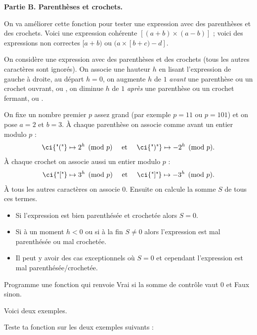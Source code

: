 \documentclass[10pt,class=report,crop=false]{standalone}
\begin{document}
\begin{activite}
\textbf{Partie B. Parenthèses et crochets.}

On va améliorer cette fonction pour tester une expression avec des parenthèses et des crochets.
Voici une expression cohérente \og{}$[(a+b)\times(a-b)]$\fg{} ; voici des expressions non correctes \og{}$[a+b)$\fg{} ou \og{}$(a\times[b+c)-d]$\fg{}.


On considère une expression avec des parenthèses et des crochets (tous les autres caractères sont ignorés). On associe une hauteur $h$ en lisant l'expression de gauche à droite, au départ 
$h=0$, on augmente $h$ de $1$ \emph{avant} une parenthèse ou un crochet ouvrant,  ou \ci{"["}, on diminue $h$ de $1$ \emph{après} une parenthèse ou un crochet fermant,  ou  \ci{"]"}.

On fixe un nombre premier $p$ assez grand (par exemple $p=11$ ou $p=101$) et on pose $a=2$ et $b=3$.
\`A chaque parenthèse on associe comme avant un entier modulo $p$ :
$$ \text{\ci{"("}} \mapsto 2^h \pmod{p} \quad \text{ et }\quad \text{\ci{")"}} \mapsto -2^h \pmod{p}.$$
\`A chaque crochet on associe aussi un entier modulo $p$ :
$$ \text{\ci{"["}} \mapsto 3^h \pmod{p} \quad \text{ et }\quad \text{\ci{"]"}} \mapsto -3^h \pmod{p}.$$
\`A tous les autres caractères on associe $0$.
Ensuite on calcule la somme $S$ de tous ces termes.



\begin{itemize}
	\item Si l'expression est bien parenthésée et crochetée alors $S=0$.
	\item Si à un moment $h<0$ ou si à la fin $S \neq 0$ alors l'expression est mal parenthésée ou mal crochetée.
	\item Il peut y avoir des cas exceptionnels où $S=0$ et cependant l'expression est mal parenthésée/crochetée.
\end{itemize}

Programme une fonction  qui renvoie
\og{}Vrai\fg{} si la somme de contrôle vaut $0$ et \og{}Faux\fg{} sinon.


Voici deux exemples.


Teste ta fonction sur les deux exemples suivants :
\mycenterline{\ci{"[[[()](()[((([[]])()(([[[]][()]]])))])]]"}}



\end{activite}
\end{document}
